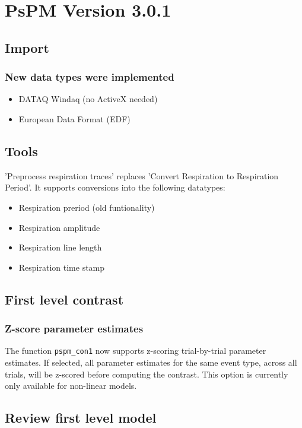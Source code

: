 \documentclass[english]{article}
\numberwithin{equation}{section}
\numberwithin{figure}{section}
\begin{document}
\section{PsPM Version 3.0.1}

\subsection*{Import}

\subsubsection*{New data types were implemented}
\begin{itemize}
\item DATAQ Windaq (no ActiveX needed)
\item European Data Format (EDF)
\end{itemize}

\subsection*{Tools}

'Preprocess respiration traces' replaces 'Convert Respiration to Respiration
Period'. It supports conversions into the following datatypes:
\begin{itemize}
\item Respiration preriod (old funtionality)
\item Respiration amplitude
\item Respiration line length
\item Respiration time stamp
\end{itemize}

\subsection*{First level contrast}

\subsubsection*{Z-score parameter estimates}

The function \texttt{pspm\_con1} now supports z-scoring trial-by-trial
parameter estimates. If selected, all parameter estimates for the
same event type, across all trials, will be z-scored before computing
the contrast. This option is currently only available for non-linear
models.

\subsection*{Review first level model}
\end{document}

